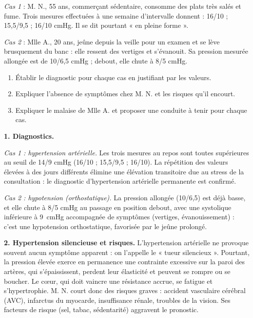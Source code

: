 \documentclass[11pt]{article}
\begin{document}
\begin{exoresolu}
\emph{Cas 1} : M. N., 55 ans, commerçant sédentaire, consomme des plats très salés et fume. Trois mesures effectuées à une semaine d'intervalle donnent : 16/10 ; 15,5/9,5 ; 16/10 cmHg. Il se dit pourtant « en pleine forme ».

\emph{Cas 2} : Mlle A., 20 ans, jeûne depuis la veille pour un examen et se lève brusquement du banc : elle ressent des vertiges et s'évanouit. Sa pression mesurée allongée est de 10/6,5 cmHg ; debout, elle chute à 8/5 cmHg.

\begin{enumerate}
\item Établir le diagnostic pour chaque cas en justifiant par les valeurs.
\item Expliquer l'absence de symptômes chez M. N. et les risques qu'il encourt.
\item Expliquer le malaise de Mlle A. et proposer une conduite à tenir pour chaque cas.
\end{enumerate}

\tcblower

\textbf{1. Diagnostics.}

\emph{Cas 1 : hypertension artérielle.} Les trois mesures au repos sont toutes supérieures au seuil de 14/9 cmHg (16/10 ; 15,5/9,5 ; 16/10). La répétition des valeurs élevées à des jours différents élimine une élévation transitoire due au stress de la consultation : le diagnostic d'hypertension artérielle permanente est confirmé.

\emph{Cas 2 : hypotension (orthostatique).} La pression allongée (10/6,5) est déjà basse, et elle chute à 8/5 cmHg au passage en position debout, avec une systolique inférieure à \SI{9}{cmHg} accompagnée de symptômes (vertiges, évanouissement) : c'est une hypotension orthostatique, favorisée par le jeûne prolongé.

\textbf{2. Hypertension silencieuse et risques.} L'hypertension artérielle ne provoque souvent aucun symptôme apparent : on l'appelle le « tueur silencieux ». Pourtant, la pression élevée exerce en permanence une contrainte excessive sur la paroi des artères, qui s'épaississent, perdent leur élasticité et peuvent se rompre ou se boucher. Le c\oe ur, qui doit vaincre une résistance accrue, se fatigue et s'hypertrophie. M. N. court donc des risques graves : accident vasculaire cérébral (AVC), infarctus du myocarde, insuffisance rénale, troubles de la vision. Ses facteurs de risque (sel, tabac, sédentarité) aggravent le pronostic.


\end{exoresolu}
\end{document}
